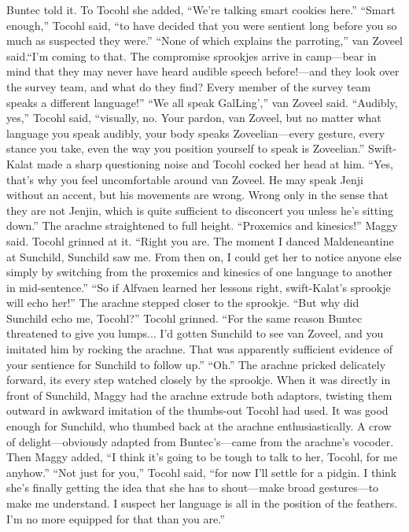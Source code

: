 \documentclass[9pt]{article}
\begin{document}
Buntec told it. To Tocohl she added, “We’re talking smart cookies here.”
“Smart enough,” Tocohl said, “to have decided that you were sentient long before you so much as
suspected they were.”
“None of which explains the parroting,” van Zoveel said.“I’m coming to that. The compromise sprookjes arrive in camp—bear in mind that they may never
have heard audible speech before!—and they look over the survey team, and what do they find? Every
member of the survey team speaks a different language!”
“We all speak GalLing’,” van Zoveel said.
“Audibly, yes,” Tocohl said, “visually, no. Your pardon, van Zoveel, but no matter what language
you speak audibly, your body speaks Zoveelian—every gesture, every stance you take, even the way
you position yourself to speak is Zoveelian.” Swift-Kalat made a sharp questioning noise and Tocohl
cocked her head at him. “Yes, that’s why you feel uncomfortable around van Zoveel. He may speak
Jenji without an accent, but his movements are wrong. Wrong only in the sense that they are not Jenjin,
which is quite sufficient to disconcert you unless he’s sitting down.”
The arachne straightened to full height. “Proxemics and kinesics!” Maggy said.
Tocohl grinned at it. “Right you are. The moment I danced Maldeneantine at Sunchild, Sunchild saw
me. From then on, I could get her to notice anyone else simply by switching from the proxemics and
kinesics of one language to another in mid-sentence.”
“So if Alfvaen learned her lessons right, swift-Kalat’s sprookje will echo her!” The arachne stepped
closer to the sprookje. “But why did Sunchild echo me, Tocohl?”
Tocohl grinned. “For the same reason Buntec threatened to give you lumps... I’d gotten Sunchild to
see van Zoveel, and you imitated him by rocking the arachne. That was apparently sufficient evidence of
your sentience for Sunchild to follow up.”
“Oh.” The arachne pricked delicately forward, its every step watched closely by the sprookje. When
it was directly in front of Sunchild, Maggy had the arachne extrude both adaptors, twisting them outward
in awkward imitation of the thumbs-out Tocohl had used.
It was good enough for Sunchild, who thumbed back at the arachne enthusiastically. A crow of
delight—obviously adapted from Buntec’s—came from the arachne’s vocoder. Then Maggy added, “I
think it’s going to be tough to talk to her, Tocohl, for me anyhow.”
“Not just for you,” Tocohl said, “for now I’ll settle for a pidgin. I think she’s finally getting the idea
that she has to shout—make broad gestures—to make me understand. I suspect her language is all in the
position of the feathers. I’m no more equipped for that than you are.”
\end{document}

